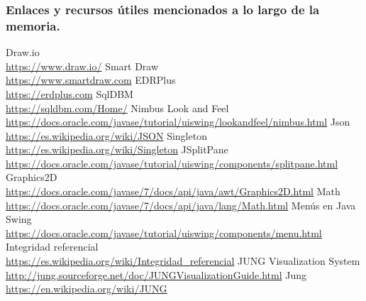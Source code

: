 \begin{thebibliography}{9}
\subsubsection*{Enlaces y recursos útiles mencionados a lo largo de la memoria.}

Draw.io\\
\url{https://www.draw.io/}
Smart Draw\\
\url{https://www.smartdraw.com}
EDRPlus\\
\url{https://erdplus.com}
SqlDBM\\
\url{https://sqldbm.com/Home/}
Nimbus Look and Feel
\\\url{https://docs.oracle.com/javase/tutorial/uiswing/lookandfeel/nimbus.html}
Json
\\\url{https://es.wikipedia.org/wiki/JSON}
Singleton
\\\url{https://es.wikipedia.org/wiki/Singleton}
JSplitPane
\\\url{https://docs.oracle.com/javase/tutorial/uiswing/components/splitpane.html}
Graphics2D
\\\url{https://docs.oracle.com/javase/7/docs/api/java/awt/Graphics2D.html}
Math
\\\url{https://docs.oracle.com/javase/7/docs/api/java/lang/Math.html}
Menús en Java Swing
\\\url{https://docs.oracle.com/javase/tutorial/uiswing/components/menu.html}
Integridad referencial
\\\url{https://es.wikipedia.org/wiki/Integridad_referencial}
JUNG Visualization System
\\\url{http://jung.sourceforge.net/doc/JUNGVisualizationGuide.html}
Jung
\\\url{https://en.wikipedia.org/wiki/JUNG}

\end{thebibliography}

